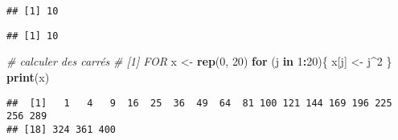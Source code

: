 \documentclass[]{book}
\newenvironment{Shaded}{\begin{snugshade}}{\end{snugshade}}
\newcommand{\KeywordTok}[1]{\textcolor[rgb]{0.13,0.29,0.53}{\textbf{#1}}}
\newcommand{\DataTypeTok}[1]{\textcolor[rgb]{0.13,0.29,0.53}{#1}}
\newcommand{\DecValTok}[1]{\textcolor[rgb]{0.00,0.00,0.81}{#1}}
\newcommand{\StringTok}[1]{\textcolor[rgb]{0.31,0.60,0.02}{#1}}
\newcommand{\CommentTok}[1]{\textcolor[rgb]{0.56,0.35,0.01}{\textit{#1}}}
\newcommand{\ControlFlowTok}[1]{\textcolor[rgb]{0.13,0.29,0.53}{\textbf{#1}}}
\newcommand{\OperatorTok}[1]{\textcolor[rgb]{0.81,0.36,0.00}{\textbf{#1}}}
\newcommand{\NormalTok}[1]{#1}
\theoremstyle{definition}
\theoremstyle{definition}
\theoremstyle{definition}
\theoremstyle{remark}
\begin{document}
\begin{Shaded}
\end{Shaded}

\begin{verbatim}
## [1] 10
\end{verbatim}

\begin{Shaded}
\end{Shaded}

\begin{verbatim}
## [1] 10
\end{verbatim}

\begin{Shaded}
\begin{Highlighting}[]
\CommentTok{# calculer des carrés}
\CommentTok{# [1] FOR}
\NormalTok{x <-}\StringTok{ }\KeywordTok{rep}\NormalTok{(}\DecValTok{0}\NormalTok{, }\DecValTok{20}\NormalTok{)}
\ControlFlowTok{for}\NormalTok{ (j }\ControlFlowTok{in} \DecValTok{1}\OperatorTok{:}\DecValTok{20}\NormalTok{)\{}
\NormalTok{  x[j] <-}\StringTok{ }\NormalTok{j}\OperatorTok{^}\DecValTok{2}
\NormalTok{\}}
\KeywordTok{print}\NormalTok{(x)}
\end{Highlighting}
\end{Shaded}

\begin{verbatim}
##  [1]   1   4   9  16  25  36  49  64  81 100 121 144 169 196 225 256 289
## [18] 324 361 400
\end{verbatim}
\end{document}
